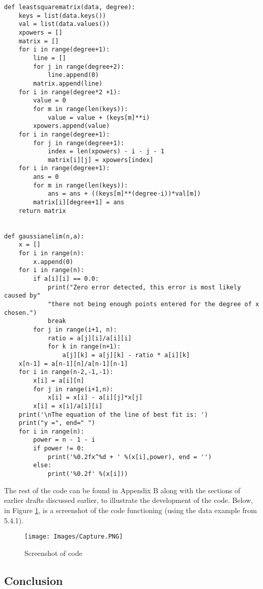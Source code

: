 \documentclass{article}
\begin{document}
\lstset{language=Python}
\lstset{frame=lines}
\lstset{basicstyle=\footnotesize}
\begin{lstlisting}
def leastsquarematrix(data, degree):
    keys = list(data.keys())
    val = list(data.values())
    xpowers = []
    matrix = []
    for i in range(degree+1):
        line = []
        for j in range(degree+2):
            line.append(0)
        matrix.append(line)
    for i in range(degree*2 +1):
        value = 0
        for m in range(len(keys)):
            value = value + (keys[m]**i)
        xpowers.append(value)
    for i in range(degree+1):
        for j in range(degree+1):
            index = len(xpowers) - i - j - 1
            matrix[i][j] = xpowers[index]
    for i in range(degree+1):
        ans = 0
        for m in range(len(keys)):
            ans = ans + ((keys[m]**(degree-i))*val[m])
        matrix[i][degree+1] = ans
    return matrix
    

def gaussianelim(n,a):
    x = []
    for i in range(n):
        x.append(0)
    for i in range(n):
        if a[i][i] == 0.0:
            print("Zero error detected, this error is most likely caused by"
            "there not being enough points entered for the degree of x chosen.")
            break
        for j in range(i+1, n):
            ratio = a[j][i]/a[i][i]
            for k in range(n+1):
                a[j][k] = a[j][k] - ratio * a[i][k]
    x[n-1] = a[n-1][n]/a[n-1][n-1]
    for i in range(n-2,-1,-1):
        x[i] = a[i][n]
        for j in range(i+1,n):
            x[i] = x[i] - a[i][j]*x[j]
        x[i] = x[i]/a[i][i]
    print('\nThe equation of the line of best fit is: ')
    print("y =", end=" ")
    for i in range(n):
        power = n - 1 - i
        if power != 0:
            print('%0.2fx^%d + ' %(x[i],power), end = '')
        else:
            print('%0.2f' %(x[i]))
\end{lstlisting}
The rest of the code can be found in Appendix B along with the sections of earlier drafts discussed earlier, to illustrate the development of the code. Below, in Figure \ref{codephoto}, is a screenshot of the code functioning (using the data example from 5.4.1).

\begin{figure}[H]
  \centering
  \texttt{[image: Images/Capture.PNG]}
  \caption{Screenshot of code}
  \label{codephoto}
\end{figure}

\subsection{Conclusion}
\end{document}
